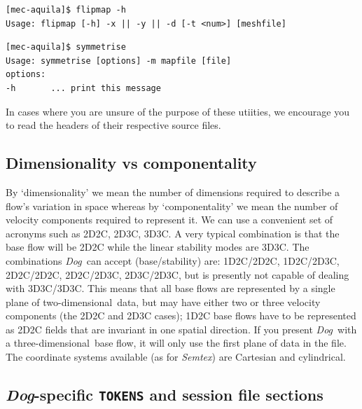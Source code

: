 \documentclass[11pt,a4paper]{report}
\newcommand\twod{two-di\-men\-sion\-al}
\newcommand\threed{three-di\-men\-sion\-al}
\newcommand{\Semtex}{\emph{Semtex}}
\newcommand{\Dog}{\emph{Dog}}
\begin{document}
{\small
\begin{verbatim}
[mec-aquila]$ flipmap -h
Usage: flipmap [-h] -x || -y || -d [-t <num>] [meshfile]
\end{verbatim}
}

{\small
\begin{verbatim}
[mec-aquila]$ symmetrise
Usage: symmetrise [options] -m mapfile [file]
options:
-h       ... print this message
\end{verbatim}
}

In cases where you are unsure of the purpose of these utiities, we
encourage you to read the headers of their respective source files.

\subsection{Dimensionality vs componentality}

By `dimensionality' we mean the number of dimensions required to
describe a flow's variation in space whereas by `componentality' we
mean the number of velocity components required to represent it.  We
can use a convenient set of acronyms such as 2D2C, 2D3C, 3D3C.  A very
typical combination is that the base flow will be 2D2C while the
linear stability modes are 3D3C.  The combinations \Dog\ can accept
(base/stability) are: 1D2C/2D2C, 1D2C/2D3C, 2D2C/2D2C, 2D2C/2D3C,
2D3C/2D3C, but is presently not capable of dealing with 3D3C/3D3C.
%
This means that all base flows are represented by a single plane of
\twod\ data, but may have either two or three velocity components (the
2D2C and 2D3C cases); 1D2C base flows have to be represented as 2D2C
fields that are invariant in one spatial direction.  If you present
\Dog\ with a \threed\ base flow, it will only use the first plane of
data in the file.
%
The coordinate systems available (as for \Semtex) are Cartesian and
cylindrical.  \citep[One might anticipate that 1D2C/2D3C analyses are
  not very useful owing to Squire's theorem for stability of `parallel
  shear flows', see e.g.][but Squire's theorem does not hold in
  cylindrical coordinates.]{schmid01}

\subsection{\Dog-specific \texttt{TOKENS} and session file sections}
\label{sec.specific}
\end{document}

